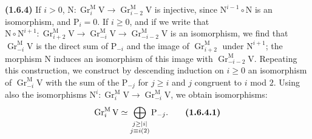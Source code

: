 \documentclass[11pt,leqno]{article}
\begin{document}
\textbf{(1.6.4)} If \(i>0\), \(\mathrm{N}:\operatorname{Gr}_i^{\mathrm{M}}\mathrm{V}\to\operatorname{Gr}_{i-2}^{\mathrm{M}}\mathrm{V}\) is injective, since \(\mathrm{N}^{i-1}\circ\mathrm{N}\) is an isomorphism, and \(\mathrm{P}_i=0\). If \(i\ge0\), and if we write that \(\mathrm{N}\circ\mathrm{N}^{i+1}:\operatorname{Gr}_{i+2}^{\mathrm{M}}\mathrm{V}\to\operatorname{Gr}_{-i}^{\mathrm{M}}\mathrm{V}\to\operatorname{Gr}_{-i-2}^{\mathrm{M}}\mathrm{V}\) is an isomorphism, we find that \(\operatorname{Gr}_{-i}^{\mathrm{M}}\mathrm{V}\) is the direct sum of \(\mathrm{P}_{-i}\) and the image of \(\operatorname{Gr}_{i+2}^{\mathrm{M}}\) under \(\mathrm{N}^{i+1}\); the morphism \(\mathrm{N}\) induces an isomorphism of this image with \(\operatorname{Gr}_{-i-2}^{\mathrm{M}}\mathrm{V}\). Repeating this construction, we construct by descending induction on \(i\ge0\) an isomorphism of \(\operatorname{Gr}_{-i}^{\mathrm{M}}\mathrm{V}\) with the sum of the \(\mathrm{P}_{-j}\) for \(j\ge i\) and \(j\) congruent to \(i\) mod \(2\). Using also the isomorphisms \(\mathrm{N}^i:\operatorname{Gr}_i^{\mathrm{M}}\mathrm{V}\to\operatorname{Gr}_{-i}^{\mathrm{M}}\mathrm{V}\), we obtain isomorphisms:
\[
\operatorname{Gr}_i^{\mathrm{M}}\mathrm{V}
\simeq
\bigoplus_{\substack{j\ge|i|\\j\equiv i(2)}}\mathrm{P}_{-j}.
\tag*{\textbf{(1.6.4.1)}}
\]
\end{document}
